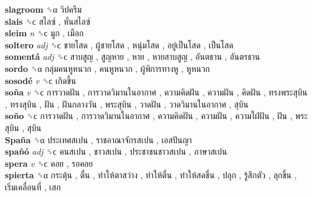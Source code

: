 \textbf{slagroom} ␝α   วิปครีม   \\
\textbf{slais} ␝ϲ   สไลซ์ ,  หั่นสไลซ์   \\
\textbf{sleim} \emph{n}  ␝ϲ   มูก ,  เมือก   \\
\textbf{soltero} \emph{adj}  ␝ϲ   ชายโสด ,  ผู้ชายโสด ,  หนุ่มโสด ,  อยู่เป็นโสด ,  เป็นโสด   \\
\textbf{somentá} \emph{adj}  ␝ϲ   สาบสูญ ,  สูญหาย ,  หาย ,  หายสาบสูญ ,  อันตธาน ,  อันตรธาน   \\
\textbf{sordo} ␝α   กลุ่มคนหูหนวก ,  คนหูหนวก ,  ผู้พิการทางหู ,  หูหนวก   \\
\textbf{sosodé} \emph{v}  ␝ϲ   เกิดขึ้น   \\
\textbf{soña} \emph{v}  ␝ϲ   การวาดฝัน ,  การวาดวิมานในอากาศ ,  ความคิดฝัน ,  ความฝัน ,  คิดฝัน ,  ทรงพระสุบิน ,  ทรงสุบิน ,  ฝัน ,  ฝันกลางวัน ,  พระสุบิน ,  วาดฝัน ,  วาดวิมานในอากาศ ,  สุบิน   \\
\textbf{soño} ␝ϲ   การวาดฝัน ,  การวาดวิมานในอากาศ ,  ความคิดฝัน ,  ความฝัน ,  ความใฝ่ฝัน ,  ฝัน ,  พระสุบิน ,  สุบิน   \\
\textbf{Spaña} ␝α   ประเทศสเปน ,  ราชอาณาจักรสเปน ,  เอสปันญา   \\
\textbf{spañó} \emph{adj}  ␝ϲ   คนสเปน ,  ชาวสเปน ,  ประชาชนชาวสเปน ,  ภาษาสเปน   \\
\textbf{spera} \emph{v}  ␝ϲ   คอย ,  รอคอย   \\
\textbf{spierta} ␝α   กระตุ้น ,  ตื่น ,  ทำให้ตาสว่าง ,  ทำให้ตื่น ,  ทำให้สดชื่น ,  ปลุก ,  รู้สึกตัว ,  ลุกขึ้น ,  เริ่มเคลื่อนที่ ,  เสก   \\
